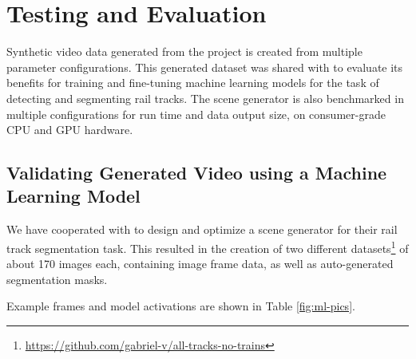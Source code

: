 \chapter{Testing and Evaluation}
\label{chapter:testing-and-evaluation}

Synthetic video data generated from the project is created from multiple parameter configurations. This generated dataset was shared with \cite{ALEXPETRE} to evaluate its benefits for training and fine-tuning machine learning models for the task of detecting and segmenting rail tracks. The scene generator is also benchmarked in multiple configurations for run time and data output size, on consumer-grade CPU and GPU hardware.

\section{Validating Generated Video using a Machine Learning Model}
\label{sec:evaluate-ml}

We have cooperated with \cite{ALEXPETRE} to design and optimize a scene generator for their rail track segmentation task. This resulted in the creation of two different datasets\footnote{\url{https://github.com/gabriel-v/all-tracks-no-trains}} of about 170 images each, containing image frame data, as well as auto-generated segmentation masks.

Example frames and model activations are shown in Table \ref{fig:ml-pics}.

